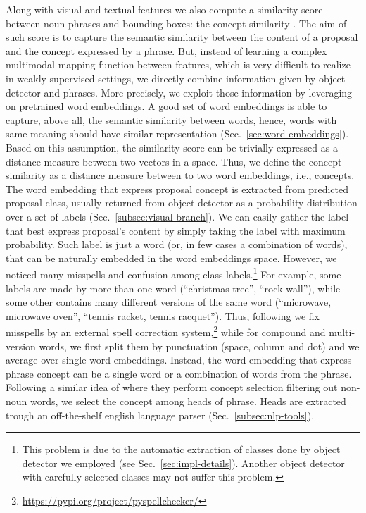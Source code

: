 Along with visual and textual features we also compute a similarity
score between noun phrases and bounding boxes: the concept similarity
\cite{wang2019phrase}. The aim of such score is to capture the
semantic similarity between the content of a proposal and the concept
expressed by a phrase. But, instead of learning a complex multimodal
mapping function between features, which is very difficult to realize
in weakly supervised settings, we directly combine information given
by object detector and phrases. More precisely, we exploit those
information by leveraging on pretrained word embeddings. A good set of
word embeddings is able to capture, above all, the semantic similarity
between words, hence, words with same meaning should have similar
representation (Sec.~\ref{sec:word-embeddings}). Based on this
assumption, the similarity score can be trivially expressed as a
distance measure between two vectors in a space. Thus, we define the
concept similarity as a distance measure between to two word
embeddings, i.e., concepts. The word embedding that express proposal
concept is extracted from predicted proposal class, usually returned
from object detector as a probability distribution over a set of
labels (Sec.~\ref{subsec:visual-branch}). We can easily gather the
label that best express proposal's content by simply taking the label
with maximum probability. Such label is just a word (or, in few cases
a combination of words), that can be naturally embedded in the word
embeddings space. However, we noticed many misspells and confusion
among class labels.\footnote{This problem is due to the automatic
extraction of classes done by object detector we employed (see
Sec.~\ref{sec:impl-details}). Another object detector with carefully
selected classes may not suffer this problem.} For example, some
labels are made by more than one word (``christmas tree'', ``rock
wall''), while some other contains many different versions of the same
word (``microwave, microwave oven'', ``tennis racket, tennis
racquet''). Thus, following \cite{wang2019phrase} we fix misspells by
an external spell correction
system,\footnote{\href{https://pypi.org/project/pyspellchecker/}{https://pypi.org/project/pyspellchecker/}}
while for compound and multi-version words, we first split them by
punctuation (space, column and dot) and we average over single-word
embeddings. Instead, the word embedding that express phrase concept
can be a single word or a combination of words from the phrase.
Following a similar idea of \cite{javed2018learning} where they
perform concept selection filtering out non-noun words, we select the
concept among heads of phrase. Heads are extracted trough an
off-the-shelf english language parser (Sec.~\ref{subsec:nlp-tools}). 

